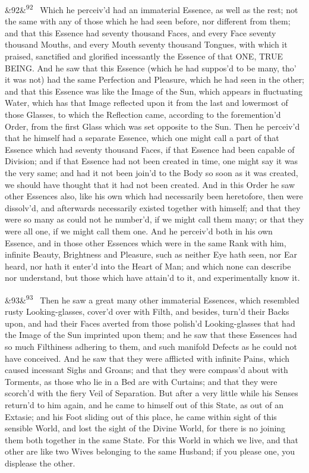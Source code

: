 \documentclass[12pt]{article}
\newcommand{\para}[1][]{\par\noindent\ifx&#1&\else\textsuperscript{\footnotesize #1}~\fi}
\begin{document}
\para[92] Which he perceiv'd had an immaterial Essence, as well as the rest; not the same with any of those which he had seen before, nor different from them; and that this Essence had seventy thousand Faces, and every Face seventy thousand Mouths, and every Mouth seventy thousand Tongues, with which it praised, sanctified and glorified incessantly the Essence of that ONE, TRUE BEING. And he saw that this Essence (which he had suppos'd to be many, tho' it was not) had the same Perfection and Pleasure, which he had seen in the other; and that this Essence was like the Image of the Sun, which appears in fluctuating Water, which has that Image reflected upon it from the last and lowermost of those Glasses, to which the Reflection came, according to the foremention'd Order, from the first Glass which was set opposite to the Sun. Then he perceiv'd that he himself had a separate Essence, which one might call a part of that Essence which had seventy thousand Faces, if that Essence had been capable of Division; and if that Essence had not been created in time, one might say it was the very same; and had it not been join'd to the Body so soon as it was created, we should have thought that it had not been created. And in this Order he saw other Essences also, like his own which had necessarily been heretofore, then were dissolv'd, and afterwards necessarily existed together with himself; and that they were so many as could not he number'd, if we might call them many; or that they were all one, if we might call them one. And he perceiv'd both in his own Essence, and in those other Essences which were in the same Rank with him, infinite Beauty, Brightness and Pleasure, such as neither Eye hath seen, nor Ear heard, nor hath it enter'd into the Heart of Man; and which none can describe nor understand, but those which have attain'd to it, and experimentally know it.

\para[93] Then he saw a great many other immaterial Essences, which resembled rusty Looking-glasses, cover'd over with Filth, and besides, turn'd their Backs upon, and had their Faces averted from those polish'd Looking-glasses that had the Image of the Sun imprinted upon them; and he saw that these Essences had so much Filthiness adhering to them, and such manifold Defects as he could not have conceived. And he saw that they were afflicted with infinite Pains, which caused incessant Sighs and Groans; and that they were compass'd about with Torments, as those who lie in a Bed are with Curtains; and that they were scorch'd with the fiery Veil of Separation. But after a very little while his Senses return'd to him again, and he came to himself out of this State, as out of an Extasie; and his Foot sliding out of this place, he came within sight of this sensible World, and lost the sight of the Divine World, for there is no joining them both together in the same State. For this World in which we live, and that other are like two Wives belonging to the same Husband; if you please one, you displease the other.
\end{document}
